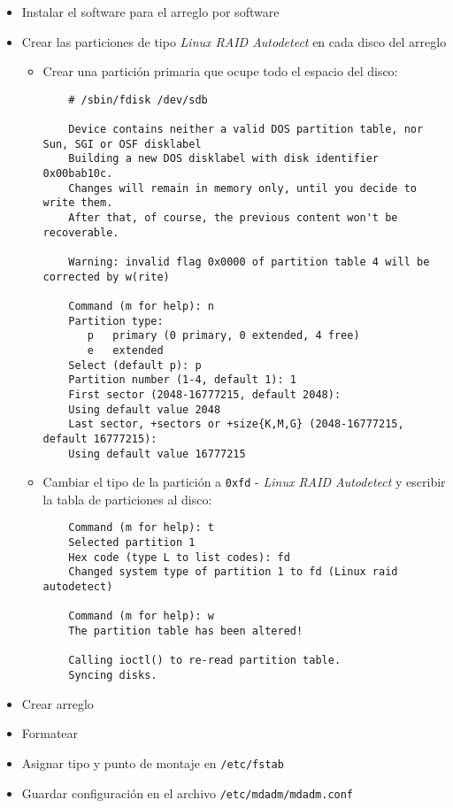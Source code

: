 \begin{itemize}
  \item Instalar el software para el arreglo por software
  \item Crear las particiones de tipo \textit{Linux RAID Autodetect} en cada disco del arreglo
    \begin{itemize}
      \item Crear una partici\'{o}n primaria que ocupe todo el espacio del disco:

{
\scriptsize
\linespread{1}
\begin{verbatim}
    # /sbin/fdisk /dev/sdb

    Device contains neither a valid DOS partition table, nor Sun, SGI or OSF disklabel
    Building a new DOS disklabel with disk identifier 0x00bab10c.
    Changes will remain in memory only, until you decide to write them.
    After that, of course, the previous content won't be recoverable.
    
    Warning: invalid flag 0x0000 of partition table 4 will be corrected by w(rite)
    
    Command (m for help): n
    Partition type:
       p   primary (0 primary, 0 extended, 4 free)
       e   extended
    Select (default p): p
    Partition number (1-4, default 1): 1
    First sector (2048-16777215, default 2048): 
    Using default value 2048
    Last sector, +sectors or +size{K,M,G} (2048-16777215, default 16777215): 
    Using default value 16777215
\end{verbatim}
}

      \item Cambiar el tipo de la partici\'{o}n a \texttt{0xfd} - \textit{Linux RAID Autodetect} y escribir la tabla de particiones al disco:

{
\scriptsize
\linespread{1}
\begin{verbatim}
    Command (m for help): t
    Selected partition 1
    Hex code (type L to list codes): fd
    Changed system type of partition 1 to fd (Linux raid autodetect)
    
    Command (m for help): w
    The partition table has been altered!
    
    Calling ioctl() to re-read partition table.
    Syncing disks.
\end{verbatim}
}

    \end{itemize}
  \item Crear arreglo
  \item Formatear
  \item Asignar tipo y punto de montaje en \texttt{/etc/fstab}
  \item Guardar configuraci\'{o}n en el archivo \texttt{/etc/mdadm/mdadm.conf}
\end{itemize}

